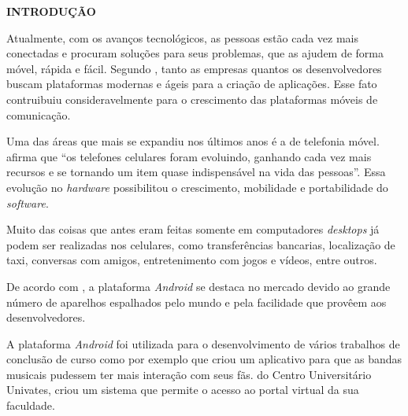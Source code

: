   \vspace{1.2em}
  \textbf{\large INTRODUÇÃO}
  \vspace{2.9em}
\thispagestyle{empty}


	\par Atualmente, com os avanços tecnológicos, as pessoas estão cada vez mais
conectadas e procuram soluções para seus problemas, que as ajudem de forma
móvel, rápida e fácil. Segundo , tanto as empresas
quantos os desenvolvedores buscam plataformas modernas e ágeis para a criação de
aplicações. Esse fato contruibuiu consideravelmente para o crescimento das
plataformas móveis de comunicação.

	\par Uma das áreas que mais se expandiu nos últimos anos é a de telefonia
móvel. \\ afirma que “os telefones celulares
foram evoluindo, ganhando cada vez mais recursos e se tornando um item quase
indispensável na vida das pessoas”. Essa evolução no \textit{hardware}
possibilitou o crescimento, mobilidade e portabilidade do \textit{software}.

	\par Muito das coisas que antes eram feitas somente em computadores
\textit{desktops} já podem ser realizadas nos celulares, como transferências
bancarias, localização de taxi, conversas com amigos, entretenimento com jogos
e vídeos, entre outros.

	\par De acordo com , a plataforma \textit{Android} se
destaca no mercado devido ao grande número de aparelhos espalhados pelo mundo e
pela facilidade que provêem aos desenvolvedores.

	\par A plataforma \textit{Android} foi utilizada para o desenvolvimento de
vários trabalhos de conclusão de curso como por exemplo 
que criou um aplicativo para que as bandas musicais pudessem ter mais interação com
seus fãs.  do Centro Universitário Univates, criou um
sistema que permite o acesso ao portal virtual da sua faculdade.

